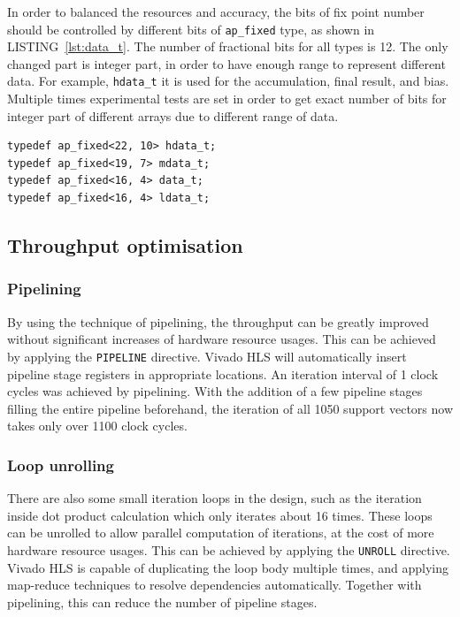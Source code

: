 \documentclass[journal]{IEEEtran}
\newcommand{\lref}[1]{LISTING~\ref{#1}}
\begin{document}
In order to balanced the resources and accuracy, the bits of fix point number should be controlled by different bits of \texttt{ap\_fixed} type, as shown in \lref{lst:data_t}. The number of fractional bits for all types is 12. The only changed part is integer part, in order to have enough range to represent different data. For example, \texttt{hdata\_t} it is used for the accumulation, final result, and bias. Multiple times experimental tests are set in order to get exact number of bits for integer part of different arrays due to different range of data.

\begin{lstlisting}[float,floatplacement=h,caption={Optimised data type},captionpos=b,label=lst:data_t]
typedef ap_fixed<22, 10> hdata_t;
typedef ap_fixed<19, 7> mdata_t;
typedef ap_fixed<16, 4> data_t;
typedef ap_fixed<16, 4> ldata_t;
\end{lstlisting}

\subsection{Throughput optimisation}

\subsubsection{Pipelining}

By using the technique of pipelining, the throughput can be greatly improved without significant increases of hardware resource usages. This can be achieved by applying the \texttt{PIPELINE} directive. Vivado HLS will automatically insert pipeline stage registers in appropriate locations. An iteration interval of 1 clock cycles was achieved by pipelining. With the addition of a few pipeline stages filling the entire pipeline beforehand, the iteration of all 1050 support vectors now takes only over 1100 clock cycles.

\subsubsection{Loop unrolling}

There are also some small iteration loops in the design, such as the iteration inside dot product calculation which only iterates about 16 times. These loops can be unrolled to allow parallel computation of iterations, at the cost of more hardware resource usages. This can be achieved by applying the \texttt{UNROLL} directive. Vivado HLS is capable of duplicating the loop body multiple times, and applying map-reduce techniques to resolve dependencies automatically. Together with pipelining, this can reduce the number of pipeline stages.
\end{document}
